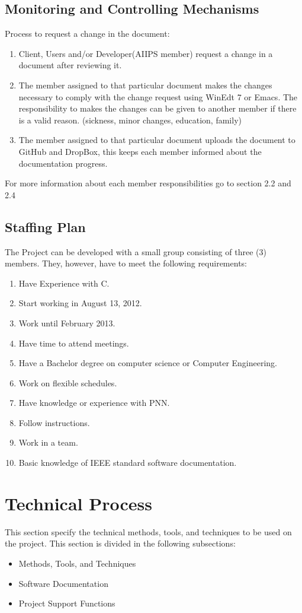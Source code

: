 \documentclass[12pt]{article}
\begin{document}
\subsection{Monitoring and Controlling Mechanisms} 
Process to request a change in the document:
\begin{enumerate}
  \item Client, Users and/or Developer(AIIPS member) request a change in a document after reviewing it.
  \item The member assigned to that particular document makes the changes necessary to comply with the change request using WinEdt 7 or Emacs. The responsibility to makes the changes can be given to another member if there is a valid reason. (sickness, minor changes, education, family)
  \item The member assigned to that particular document uploads the document to GitHub and DropBox, this keeps each member informed about the documentation progress.
\end{enumerate}
For more information about each member responsibilities go to section 2.2 and 2.4

\subsection{Staffing Plan}
The Project can be developed with a small group consisting of three (3) members. They, however, have to meet the following requirements:
\begin{enumerate}
  \item Have Experience with C.
  \item Start working in August 13, 2012.
  \item Work until February 2013.
  \item Have time to attend meetings.
  \item Have a Bachelor degree on computer science or Computer Engineering.
  \item Work on flexible schedules.
  \item Have knowledge or experience with PNN.
  \item Follow instructions.
  \item Work in a team.
  \item Basic knowledge of IEEE standard software documentation.
\end{enumerate}

\section{Technical Process}
This section specify the technical methods, tools, and techniques to be used on the project. This section is divided in the following subsections:
\begin{itemize}
  \item Methods, Tools, and Techniques
  \item Software Documentation
  \item Project Support Functions
\end{itemize}
\end{document}
